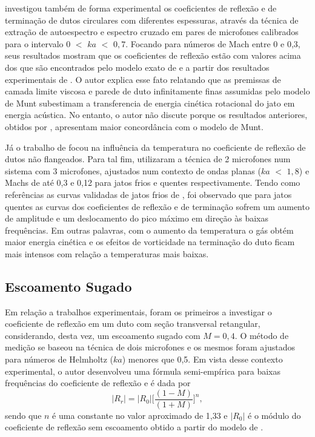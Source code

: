  investigou também de forma experimental os coeficientes de reflexão e de terminação de dutos circulares com diferentes espessuras, através da técnica de extração de autoespectro e espectro cruzado em pares de microfones calibrados para o intervalo $0$ $<$ $ka$ $<$ $0,7$. Focando para números de Mach entre 0 e 0,3, seus resultados mostram que os coeficientes de reflexão estão com valores acima dos que são encontrados pelo modelo exato de  e a partir dos resultados experimentais de . O autor explica esse fato relatando que as premissas de camada limite viscosa e parede de duto infinitamente finas assumidas pelo modelo de Munt subestimam a transferencia de energia cinética rotacional do jato em energia acústica. No entanto, o autor não discute porque os resultados anteriores, obtidos por , apresentam maior concordância com o modelo de Munt. 


Já o trabalho de  focou na influência da temperatura no coeficiente de reflexão de dutos não flangeados. Para tal fim, utilizaram a técnica de 2 microfones num sistema com 3 microfones, ajustados num contexto de ondas planas ($ka$ $<$ $1,8$) e Machs de até 0,3 e 0,12 para jatos frios e quentes respectivamente. Tendo como referências as curvas validadas de jatos frios de , foi observado que para jatos quentes as curvas dos coeficientes de reflexão e de terminação sofrem um aumento de amplitude e um deslocamento do pico máximo em direção às baixas frequências. Em outras palavras, com o aumento da temperatura o gás obtém maior energia cinética e os efeitos de vorticidade na terminação do duto ficam mais intensos com relação a temperaturas mais baixas.



\subsection{Escoamento Sugado}

Em relação a trabalhos experimentais,  foram os primeiros a investigar o coeficiente de reflexão em um duto com seção transversal retangular, considerando, desta vez, um escoamento sugado com $M = 0,4$. O método de medição se baseou na técnica de dois microfones e os mesmos foram ajustados para números de Helmholtz ($ka$) menores que 0,5. Em vista desse contexto experimental, o autor desenvolveu uma fórmula semi-empírica para baixas frequências do coeficiente de reflexão e é dada por
\begin{equation}
        |R_{r}| = |R_{0}|\bigg[\frac{(1 - M)}{(1 + M)}\bigg]^{n},
    \label{eq:R_r_ingard}
\end{equation}
sendo que $n$ é uma constante no valor aproximado de 1,33 e $|R_{0}|$ é o módulo do coeficiente de reflexão sem escoamento obtido a partir do modelo de . 

